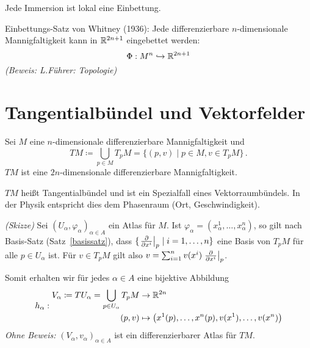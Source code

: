 \documentclass[a4paper,twoside,DIV15,BCOR12mm]{scrbook}
\renewcommand{\da}{\coloneqq}
\begin{document}
\begin{bemerkungen}
\item Jede Immersion ist lokal eine Einbettung.
\item Einbettungs-Satz von Whitney (1936): Jede differenzierbare $n$-dimensionale Mannigfaltigkeit kann in $\mathbb{R}^{2n+1}$ eingebettet werden:
\[
\Phi: M^n \hookrightarrow \mathbb{R}^{2n+1}
\]
\emph{(Beweis: L.Führer: Topologie)}
\end{bemerkungen}

\section{Tangentialbündel und Vektorfelder}

\begin{satz}[Tangentialbündel]
Sei $M$ eine $n$-dimensionale differenzierbare Mannigfaltigkeit und 
\[TM \da \bigcup_{p\in M} T_pM = \{(p,v)\mid p\in M, v\in T_pM\}\,.\]
$TM$ ist eine $2n$-dimensionale differenzierbare Mannigfaltigkeit.
\label{satz3}
\end{satz}
$TM$ heißt Tangentialbündel und ist ein Spezialfall eines Vektorraumbündels. In der Physik entspricht dies dem Phasenraum (Ort, Geschwindigkeit).

\begin{beweis}
\emph{(Skizze)} Sei $(U_\alpha, \varphi_\alpha)_{\alpha \in A}$ ein Atlas für $M$. Ist $\varphi_\alpha = (x_\alpha^1,\ldots, x_\alpha^n)$, so gilt nach Basis-Satz (\mbox{Satz \ref{basissatz}}), dass $\{\left.\frac{\partial}{\partial x^{i}}\right|_p \mid i = 1,\ldots,n\}$ eine Basis von $T_pM$ für alle $p \in U_\alpha$ ist. Für $v\in T_pM$ gilt also $v= \sum_{i=1}^n v(x^i)\left.\frac{\partial}{\partial x^{i}}\right|_p$.

Somit erhalten wir für jedes $\alpha\in A$ eine bijektive Abbildung 
\[
h_\alpha:
\begin{aligned}
V_\alpha \da TU_\alpha = \bigcup_{p\in U_\alpha} T_pM &\to \MdR^{2n} \\
(p,v) &\mapsto \big(x^1(p), \ldots, x^n(p), v(x^1), \ldots, v(x^n)\big)
\end{aligned}
\]
\emph{Ohne Beweis:} $(V_\alpha, v_\alpha)_{\alpha\in A}$ ist ein differenzierbarer Atlas für $TM$.
\end{beweis}
\end{document}
